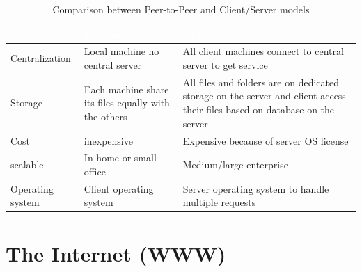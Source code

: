\begin{table}[h!]
	\centering
	\renewcommand{\arraystretch}{1.4}
	
	
	\label{tab:p2p_vs_clientserver} %
	
	\begin{tabularx}{\textwidth}{|>{\raggedright\arraybackslash}p{3cm}|>{\raggedright\arraybackslash}X|>{\raggedright\arraybackslash}X|}
		\hline
		\rowcolor{TableCyan}
		& \textcolor{white}{\textbf{Peer to peer}} & \textcolor{white}{\textbf{Client/server}} \\ \hline
		\rowcolor{TableLightBlue}
		Centralization & Local machine no central server & All client machines connect to central server to get service \\ \hline
		\rowcolor{TableLightBlue}
		Storage & Each machine share its files equally with the others & All files and folders are on dedicated storage on the server and client access their files based on database on the server \\ \hline
		\rowcolor{TableLightBlue}
		Cost & inexpensive & Expensive because of server OS license \\ \hline
		\rowcolor{TableLightBlue}
		scalable & In home or small office & Medium/large enterprise \\ \hline
		\rowcolor{TableLightBlue}
		Operating system & Client operating system & Server operating system to handle multiple requests \\ \hline
	\end{tabularx}
	\caption{Comparison between Peer-to-Peer and Client/Server models}
\end{table}



\newpage
\section{The Internet (WWW)}

